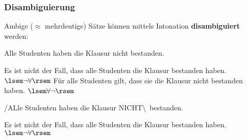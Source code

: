 
\begin{frame}
\frametitle{Disambiguierung}

Ambige ($\approx$ mehrdeutige) Sätze können mittels Intonation  \textbf{disambiguiert} werden: 

\begin{exe}
\ex  \label{exe:nicht}Alle Studenten haben die Klausur nicht bestanden.

	\begin{xlist}
	\ex Es ist nicht der Fall, dass alle Studenten die Klausur bestanden haben. \hfill $\lsem \neg \forall \rsem$
	\ex Für alle Studenten gilt, dass sie die Klausur nicht bestanden haben. \hfill $\lsem \forall \neg \rsem$
	\end{xlist}

\pause 

\ex /ALle Studenten haben die Klausur  NICHT\textbackslash\ bestanden.
	\begin{xlist}
	\ex Es ist nicht der Fall, dass alle Studenten die Klausur bestanden haben. \hfill $\lsem \neg \forall \rsem$
	\end{xlist}
\end{exe}


\end{frame}


